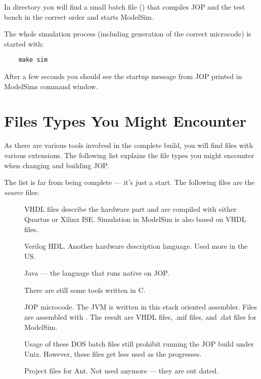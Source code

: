 In directory  you will find a small batch file
() that compiles JOP and the test bench in the correct
order and starts ModelSim.

The whole simulation process (including generation of the correct
microcode) is started with:

\begin{verbatim}
    make sim
\end{verbatim}

After a few seconds you should see the startup message from JOP
printed in ModelSims command window.

\section{Files Types You Might Encounter}

As there are various tools involved in the complete build, you will
find files with various extensions. The following list explains the
file types you might encounter when changing and building JOP.

The list is far from being complete --- it's just a start. The
following files are the \emph{source} files:

\begin{description}

\item[] VHDL files describe the hardware part and are
compiled with either Quartus or Xilinx ISE. Simulation in ModelSim
is also based on VHDL files.
\item[] Verilog HDL. Another hardware description language.
Used more in the US.

\item[] Java --- the language that runs native on JOP.

\item[] There are still some tools written in C.

\item[] JOP microcode. The JVM is written in this stack
oriented assembler. Files are assembled with . The result
are VHDL files, .mif files, and .dat files for ModelSim.

\item[] Usage of these DOS batch files still prohibit
running the JOP build under Unix. However, these files get less used
as the  progresses.

\item[] Project files for Ant. Not used anymore --- they
are out dated.


\end{description}


